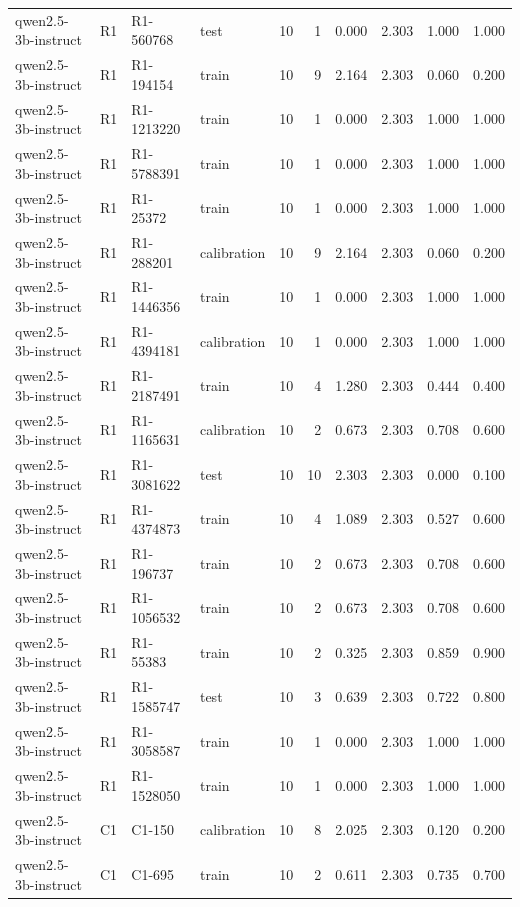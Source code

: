\begin{table}
\begin{tabular}{llllrrrrrr}
qwen2.5-3b-instruct & R1 & R1-560768 & test & 10 & 1 & 0.000 & 2.303 & 1.000 & 1.000 \\
qwen2.5-3b-instruct & R1 & R1-194154 & train & 10 & 9 & 2.164 & 2.303 & 0.060 & 0.200 \\
qwen2.5-3b-instruct & R1 & R1-1213220 & train & 10 & 1 & 0.000 & 2.303 & 1.000 & 1.000 \\
qwen2.5-3b-instruct & R1 & R1-5788391 & train & 10 & 1 & 0.000 & 2.303 & 1.000 & 1.000 \\
qwen2.5-3b-instruct & R1 & R1-25372 & train & 10 & 1 & 0.000 & 2.303 & 1.000 & 1.000 \\
qwen2.5-3b-instruct & R1 & R1-288201 & calibration & 10 & 9 & 2.164 & 2.303 & 0.060 & 0.200 \\
qwen2.5-3b-instruct & R1 & R1-1446356 & train & 10 & 1 & 0.000 & 2.303 & 1.000 & 1.000 \\
qwen2.5-3b-instruct & R1 & R1-4394181 & calibration & 10 & 1 & 0.000 & 2.303 & 1.000 & 1.000 \\
qwen2.5-3b-instruct & R1 & R1-2187491 & train & 10 & 4 & 1.280 & 2.303 & 0.444 & 0.400 \\
qwen2.5-3b-instruct & R1 & R1-1165631 & calibration & 10 & 2 & 0.673 & 2.303 & 0.708 & 0.600 \\
qwen2.5-3b-instruct & R1 & R1-3081622 & test & 10 & 10 & 2.303 & 2.303 & 0.000 & 0.100 \\
qwen2.5-3b-instruct & R1 & R1-4374873 & train & 10 & 4 & 1.089 & 2.303 & 0.527 & 0.600 \\
qwen2.5-3b-instruct & R1 & R1-196737 & train & 10 & 2 & 0.673 & 2.303 & 0.708 & 0.600 \\
qwen2.5-3b-instruct & R1 & R1-1056532 & train & 10 & 2 & 0.673 & 2.303 & 0.708 & 0.600 \\
qwen2.5-3b-instruct & R1 & R1-55383 & train & 10 & 2 & 0.325 & 2.303 & 0.859 & 0.900 \\
qwen2.5-3b-instruct & R1 & R1-1585747 & test & 10 & 3 & 0.639 & 2.303 & 0.722 & 0.800 \\
qwen2.5-3b-instruct & R1 & R1-3058587 & train & 10 & 1 & 0.000 & 2.303 & 1.000 & 1.000 \\
qwen2.5-3b-instruct & R1 & R1-1528050 & train & 10 & 1 & 0.000 & 2.303 & 1.000 & 1.000 \\
qwen2.5-3b-instruct & C1 & C1-150 & calibration & 10 & 8 & 2.025 & 2.303 & 0.120 & 0.200 \\
qwen2.5-3b-instruct & C1 & C1-695 & train & 10 & 2 & 0.611 & 2.303 & 0.735 & 0.700 \\

\end{tabular}
\end{table}
